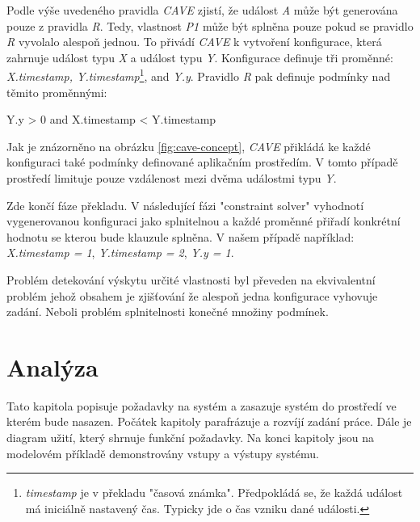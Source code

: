 \documentclass[
  digital, %
  table,   %
  nolof,     %
  nolot,     %
  oneside, %
  nocover,
  monochrome,
  12pt
]{fithesis3}
\begin{document}
Podle výše uvedeného pravidla \textit{CAVE} zjistí, že událost \textit{A} může být generována pouze z pravidla \textit{R}. Tedy, vlastnost \textit{P1} může být splněna pouze pokud se pravidlo \textit{R} vyvolalo alespoň jednou. To přivádí \textit{CAVE} k vytvoření konfigurace, která zahrnuje událost typu \textit{X} a událost typu \textit{Y}. Konfigurace definuje tři proměnné: \textit{X.timestamp, Y.timestamp}\footnote{\textit{timestamp} je v překladu "časová známka". Předpokládá se, že každá událost má iniciálně nastavený čas. Typicky jde o čas vzniku dané události.}, and \textit{Y.y}. Pravidlo \textit{R} pak definuje podmínky nad těmito proměnnými:

\begin{center}
\begin{minipage}[H]{.7\linewidth}
	\begin{mylisting}
Y.y > 0 and X.timestamp < Y.timestamp
	\end{mylisting}
	\label{fig:cave-event-example-1} 
\end{minipage}
\end{center}

Jak je znázorněno na obrázku \ref{fig:cave-concept}, \textit{CAVE} přikládá ke každé konfiguraci také podmínky definované aplikačním prostředím. V tomto případě prostředí limituje pouze vzdálenost mezi dvěma událostmi typu \textit{Y}.

Zde končí fáze překladu. V následující fázi "constraint solver" vyhodnotí vygenerovanou konfiguraci jako splnitelnou a každé proměnné přiřadí konkrétní hodnotu se kterou bude klauzule splněna. V našem případě například: \textit{X.timestamp = 1}, \textit{Y.timestamp = 2}, \textit{Y.y = 1}.

Problém detekování výskytu určité vlastnosti byl převeden na ekvivalentní problém jehož obsahem je zjišťování že alespoň jedna konfigurace vyhovuje zadání. Neboli problém splnitelnosti konečné množiny podmínek.

\chapter{Analýza}
\label{sec:analysis}

Tato kapitola popisuje požadavky na systém a zasazuje systém do prostředí ve kterém bude nasazen. Počátek kapitoly parafrázuje a rozvíjí zadání práce. Dále je diagram užití, který shrnuje funkční požadavky. Na konci kapitoly jsou na modelovém příkladě demonstrovány vstupy a výstupy systému.
\end{document}
